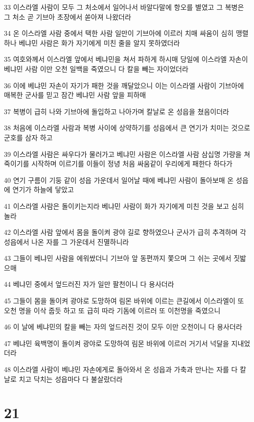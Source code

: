 \par 33 이스라엘 사람이 모두 그 처소에서 일어나서 바알다말에 항오를 별였고 그 복병은 그 처소 곧 기브아 초장에서 쏟아져 나왔더라
\par 34 온 이스라엘 사람 중에서 택한 사람 일만이 기브아에 이르러 치매 싸움이 심히 맹렬하나 베냐민 사람은 화가 자기에게 미친 줄을 알지 못하였더라
\par 35 여호와께서 이스라엘 앞에서 베냐민을 쳐서 파하게 하시매 당일에 이스라엘 자손이 베냐민 사람 이만 오천 일백을 죽였으니 다 칼을 빼는 자이었더라
\par 36 이에 베냐민 자손이 자기가 패한 것을 깨달았으니 이는 이스라엘 사람이 기브아에 매복한 군사를 믿고 잠간 베냐민 사람 앞을 피하매
\par 37 복병이 급히 나와 기브아에 돌입하고 나아가며 칼날로 온 성읍을 쳤음이더라
\par 38 처음에 이스라엘 사람과 복병 사이에 상약하기를 성읍에서 큰 연기가 치미는 것으로 군호를 삼자 하고
\par 39 이스라엘 사람은 싸우다가 물러가고 베냐민 사람은 이스라엘 사람 삼십명 가량을 쳐 죽이기를 시작하며 이르기를 이들이 정녕 처음 싸움같이 우리에게 패한다 하다가
\par 40 연기 구름이 기둥 같이 성읍 가운데서 일어날 때에 베냐민 사람이 돌아보매 온 성읍에 연기가 하늘에 닿았고
\par 41 이스라엘 사람은 돌이키는지라 베냐민 사람이 화가 자기에게 미친 것을 보고 심히 놀라
\par 42 이스라엘 사람 앞에서 몸을 돌이켜 광야 길로 향하였으나 군사가 급히 추격하며 각 성읍에서 나온 자를 그 가운데서 진멸하니라
\par 43 그들이 베냐민 사람을 에워쌌더니 기브아 앞 동편까지 쫓으며 그 쉬는 곳에서 짓밟으매
\par 44 베냐민 중에서 엎드러진 자가 일만 팔천이니 다 용사더라
\par 45 그들이 몸을 돌이켜 광야로 도망하여 림몬 바위에 이르는 큰길에서 이스라엘이 또 오천 명을 이삭 줍듯 하고 또 급히 따라 기돔에 이르러 또 이천명을 죽였으니
\par 46 이 날에 베냐민의 칼을 빼는 자의 엎드러진 것이 모두 이만 오천이니 다 용사더라
\par 47 베냐민 육백명이 돌이켜 광야로 도망하여 림몬 바위에 이르러 거기서 넉달을 지내었더라
\par 48 이스라엘 사람이 베냐민 자손에게로 돌아와서 온 성읍과 가축과 만나는 자를 다 칼날로 치고 닥치는 성읍마다 다 불살랐더라

\chapter{21}

